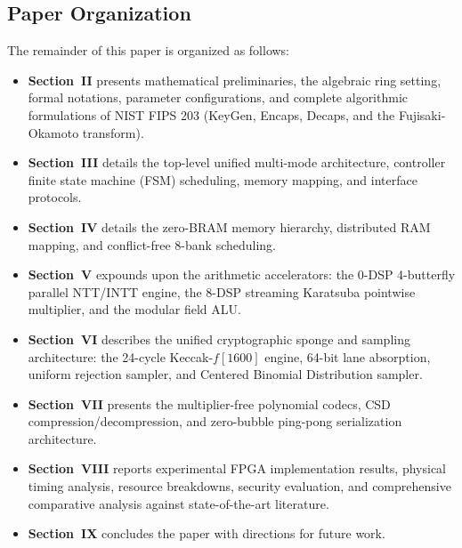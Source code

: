 \subsection{Paper Organization}
\label{sec:intro_organization}
The remainder of this paper is organized as follows:
\begin{itemize}
    \item \textbf{Section~II} presents mathematical preliminaries, the algebraic ring setting, formal notations, parameter configurations, and complete algorithmic formulations of NIST FIPS 203 (KeyGen, Encaps, Decaps, and the Fujisaki-Okamoto transform).
    \item \textbf{Section~III} details the top-level unified multi-mode architecture, controller finite state machine (FSM) scheduling, memory mapping, and interface protocols.
    \item \textbf{Section~IV} details the zero-BRAM memory hierarchy, distributed RAM mapping, and conflict-free 8-bank scheduling.
    \item \textbf{Section~V} expounds upon the arithmetic accelerators: the 0-DSP 4-butterfly parallel NTT/INTT engine, the 8-DSP streaming Karatsuba pointwise multiplier, and the modular field ALU.
    \item \textbf{Section~VI} describes the unified cryptographic sponge and sampling architecture: the 24-cycle Keccak-$f[1600]$ engine, 64-bit lane absorption, uniform rejection sampler, and Centered Binomial Distribution sampler.
    \item \textbf{Section~VII} presents the multiplier-free polynomial codecs, CSD compression/decompression, and zero-bubble ping-pong serialization architecture.
    \item \textbf{Section~VIII} reports experimental FPGA implementation results, physical timing analysis, resource breakdowns, security evaluation, and comprehensive comparative analysis against state-of-the-art literature.
    \item \textbf{Section~IX} concludes the paper with directions for future work.
\end{itemize}

